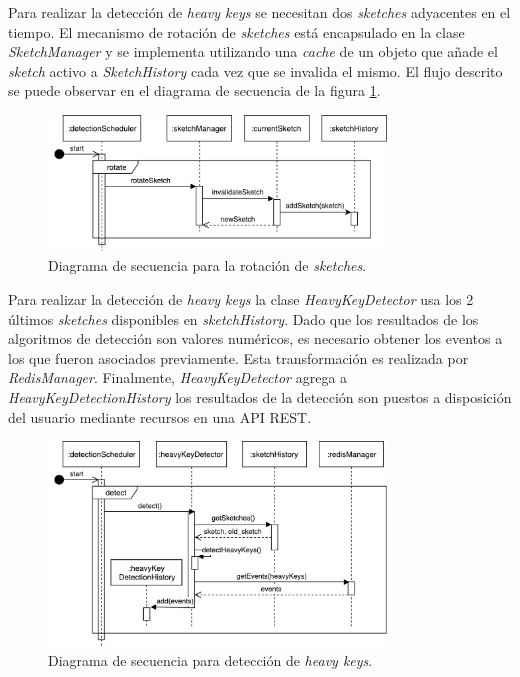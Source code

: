 \documentclass[a4paper,10pt, oneside]{article}
\begin{document}
Para realizar la detección de \textit{heavy keys} se necesitan dos \textit{sketches} adyacentes en el tiempo. El mecanismo de rotación de \textit{sketches} está encapsulado en la clase \textit{SketchManager} y se implementa utilizando una \textit{cache} de un objeto que añade el \textit{sketch} activo a \textit{SketchHistory} cada vez que se invalida el mismo. El flujo descrito se puede observar en el diagrama de secuencia de la figura \ref{fig:SecDiagDetectionSchedulerRotation}.

\begin{figure}[htbp]
	\centering
	\includegraphics[width=0.8\textwidth]{graph/SecDiag-detectionSchedulerRotation.pdf}
	\caption{Diagrama de secuencia para la rotación de \textit{sketches}.}
	\label{fig:SecDiagDetectionSchedulerRotation}
\end{figure}

Para realizar la detección de \textit{heavy keys} la clase \textit{HeavyKeyDetector} usa los 2 últimos \textit{sketches} disponibles en \textit{sketchHistory}. Dado que los resultados de los algoritmos de detección son valores numéricos, es necesario obtener los eventos a los que fueron asociados previamente. Esta transformación es realizada por \textit{RedisManager}. Finalmente, \textit{HeavyKeyDetector} agrega a \textit{HeavyKeyDetectionHistory} los resultados de la detección son puestos a disposición del usuario mediante recursos en una API REST.

\begin{figure}[htbp]
	\centering
	\includegraphics[width=0.8\textwidth]{graph/SecDiag-detectionSchedulerDetect.pdf}
	\caption{Diagrama de secuencia para detección de \textit{heavy keys}.}
	\label{fig:SecDiagDetectionSchedulerDetect}
\end{figure}
\end{document}
